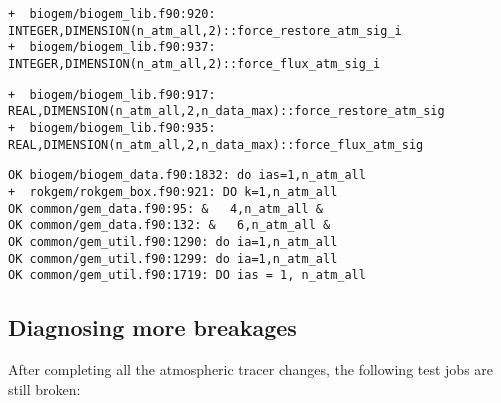 \documentclass[a4paper,10pt,article]{memoir}
\begin{document}
\begin{verbatim}
+  biogem/biogem_lib.f90:920: INTEGER,DIMENSION(n_atm_all,2)::force_restore_atm_sig_i
+  biogem/biogem_lib.f90:937: INTEGER,DIMENSION(n_atm_all,2)::force_flux_atm_sig_i
\end{verbatim}

\begin{verbatim}
+  biogem/biogem_lib.f90:917: REAL,DIMENSION(n_atm_all,2,n_data_max)::force_restore_atm_sig
+  biogem/biogem_lib.f90:935: REAL,DIMENSION(n_atm_all,2,n_data_max)::force_flux_atm_sig
\end{verbatim}

\begin{verbatim}
OK biogem/biogem_data.f90:1832: do ias=1,n_atm_all
+  rokgem/rokgem_box.f90:921: DO k=1,n_atm_all
OK common/gem_data.f90:95: &   4,n_atm_all &
OK common/gem_data.f90:132: &   6,n_atm_all &
OK common/gem_util.f90:1290: do ia=1,n_atm_all
OK common/gem_util.f90:1299: do ia=1,n_atm_all
OK common/gem_util.f90:1719: DO ias = 1, n_atm_all
\end{verbatim}

\subsection{Diagnosing more breakages}

After completing all the atmospheric tracer changes, the following
test jobs are still broken:
\end{document}
